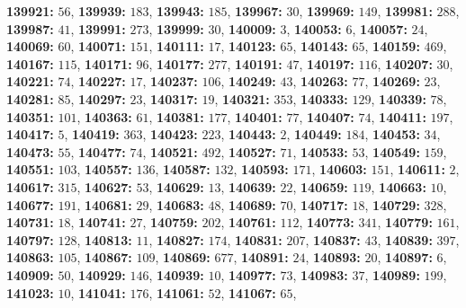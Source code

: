 \textsf{\bfseries 139921:} $56$, \textsf{\bfseries 139939:} $183$, \textsf{\bfseries 139943:} $185$, \textsf{\bfseries 139967:} $30$, \textsf{\bfseries 139969:} $149$, \textsf{\bfseries 139981:} $288$, \textsf{\bfseries 139987:} $41$, \textsf{\bfseries 139991:} $273$, \textsf{\bfseries 139999:} $30$, \textsf{\bfseries 140009:} $3$, \textsf{\bfseries 140053:} $6$, \textsf{\bfseries 140057:} $24$, \textsf{\bfseries 140069:} $60$, \textsf{\bfseries 140071:} $151$, \textsf{\bfseries 140111:} $17$, \textsf{\bfseries 140123:} $65$, \textsf{\bfseries 140143:} $65$, \textsf{\bfseries 140159:} $469$, \textsf{\bfseries 140167:} $115$, \textsf{\bfseries 140171:} $96$, \textsf{\bfseries 140177:} $277$, \textsf{\bfseries 140191:} $47$, \textsf{\bfseries 140197:} $116$, \textsf{\bfseries 140207:} $30$, \textsf{\bfseries 140221:} $74$, \textsf{\bfseries 140227:} $17$, \textsf{\bfseries 140237:} $106$, \textsf{\bfseries 140249:} $43$, \textsf{\bfseries 140263:} $77$, \textsf{\bfseries 140269:} $23$, \textsf{\bfseries 140281:} $85$, \textsf{\bfseries 140297:} $23$, \textsf{\bfseries 140317:} $19$, \textsf{\bfseries 140321:} $353$, \textsf{\bfseries 140333:} $129$, \textsf{\bfseries 140339:} $78$, \textsf{\bfseries 140351:} $101$, \textsf{\bfseries 140363:} $61$, \textsf{\bfseries 140381:} $177$, \textsf{\bfseries 140401:} $77$, \textsf{\bfseries 140407:} $74$, \textsf{\bfseries 140411:} $197$, \textsf{\bfseries 140417:} $5$, \textsf{\bfseries 140419:} $363$, \textsf{\bfseries 140423:} $223$, \textsf{\bfseries 140443:} $2$, \textsf{\bfseries 140449:} $184$, \textsf{\bfseries 140453:} $34$, \textsf{\bfseries 140473:} $55$, \textsf{\bfseries 140477:} $74$, \textsf{\bfseries 140521:} $492$, \textsf{\bfseries 140527:} $71$, \textsf{\bfseries 140533:} $53$, \textsf{\bfseries 140549:} $159$, \textsf{\bfseries 140551:} $103$, \textsf{\bfseries 140557:} $136$, \textsf{\bfseries 140587:} $132$, \textsf{\bfseries 140593:} $171$, \textsf{\bfseries 140603:} $151$, \textsf{\bfseries 140611:} $2$, \textsf{\bfseries 140617:} $315$, \textsf{\bfseries 140627:} $53$, \textsf{\bfseries 140629:} $13$, \textsf{\bfseries 140639:} $22$, \textsf{\bfseries 140659:} $119$, \textsf{\bfseries 140663:} $10$, \textsf{\bfseries 140677:} $191$, \textsf{\bfseries 140681:} $29$, \textsf{\bfseries 140683:} $48$, \textsf{\bfseries 140689:} $70$, \textsf{\bfseries 140717:} $18$, \textsf{\bfseries 140729:} $328$, \textsf{\bfseries 140731:} $18$, \textsf{\bfseries 140741:} $27$, \textsf{\bfseries 140759:} $202$, \textsf{\bfseries 140761:} $112$, \textsf{\bfseries 140773:} $341$, \textsf{\bfseries 140779:} $161$, \textsf{\bfseries 140797:} $128$, \textsf{\bfseries 140813:} $11$, \textsf{\bfseries 140827:} $174$, \textsf{\bfseries 140831:} $207$, \textsf{\bfseries 140837:} $43$, \textsf{\bfseries 140839:} $397$, \textsf{\bfseries 140863:} $105$, \textsf{\bfseries 140867:} $109$, \textsf{\bfseries 140869:} $677$, \textsf{\bfseries 140891:} $24$, \textsf{\bfseries 140893:} $20$, \textsf{\bfseries 140897:} $6$, \textsf{\bfseries 140909:} $50$, \textsf{\bfseries 140929:} $146$, \textsf{\bfseries 140939:} $10$, \textsf{\bfseries 140977:} $73$, \textsf{\bfseries 140983:} $37$, \textsf{\bfseries 140989:} $199$, \textsf{\bfseries 141023:} $10$, \textsf{\bfseries 141041:} $176$, \textsf{\bfseries 141061:} $52$, \textsf{\bfseries 141067:} $65$, 

